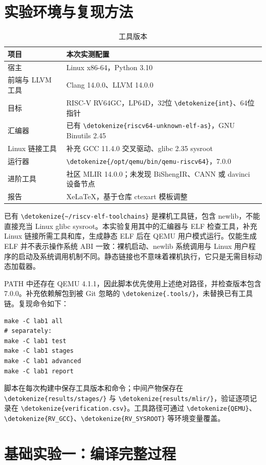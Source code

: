 \documentclass[UTF8,a4paper,10pt,fontset=none]{ctexart}
\newcommand{\code}[1]{{\small\expandafter\nolinkurl\expandafter{\detokenize{#1}}}}
\begin{document}
\section{实验环境与复现方法}
\begin{table}[H]
\centering
\begin{tabularx}{\linewidth}{lY}
\toprule 项目 & 本次实测配置 \\
\midrule
宿主 & Linux x86-64，Python 3.10 \\
前端与 LLVM 工具 & Clang 14.0.0、LLVM 14.0.0 \\
目标 & RISC-V RV64GC，LP64D，32位 \code{int}、64位指针 \\
汇编器 & 已有 \code{riscv64-unknown-elf-as}，GNU Binutils 2.45 \\
Linux 链接工具 & 补充 GCC 11.4.0 交叉驱动、glibc 2.35 sysroot \\
运行器 & \code{/opt/qemu/bin/qemu-riscv64}，7.0.0 \\
进阶工具 & 社区 MLIR 14.0.0；未发现 BiShengIR、CANN 或 davinci 设备节点 \\
报告 & XeLaTeX，基于仓库 ctexart 模板调整 \\
\bottomrule
\end{tabularx}
\caption{工具版本}
\end{table}

已有 \code{~/riscv-elf-toolchains} 是裸机工具链，包含 newlib，不能直接充当 Linux glibc sysroot。本实验复用其中的汇编器与 ELF 检查工具，补充 Linux 链接所需工具和库，生成静态 ELF 后在 QEMU 用户模式运行。仅能生成 ELF 并不表示操作系统 ABI 一致：裸机启动、newlib 系统调用与 Linux 用户程序的启动及系统调用机制不同。静态链接也不意味着裸机执行，它只是无需目标动态加载器。

PATH 中还存在 QEMU 4.1.1，因此脚本优先使用上述绝对路径，并检查版本包含 7.0.0。补充依赖解包到被 Git 忽略的 \code{.tools/}，未替换已有工具链。复现命令如下：
\begin{lstlisting}[numbers=none]
make -C lab1 all
# separately:
make -C lab1 test
make -C lab1 stages
make -C lab1 advanced
make -C lab1 report
\end{lstlisting}
脚本在每次构建中保存工具版本和命令；中间产物保存在 \code{results/stages/} 与 \code{results/mlir/}，验证逐项记录在 \code{verification.csv}。工具路径可通过 \code{QEMU}、\code{RV_GCC}、\code{RV_SYSROOT} 等环境变量覆盖。

\section{基础实验一：编译完整过程}
\end{document}
